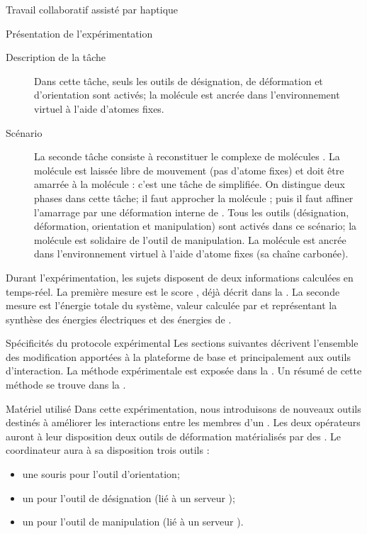 \documentclass[myfrancais,ngerman,english,french]{mythesis}
\begin{document}
\begin{mychapter}{Travail collaboratif assisté par haptique}
\begin{mysection}{Présentation de l'expérimentation}
\begin{mysubsection}{Description de la tâche}
\begin{description}
						Dans cette tâche, seuls les outils de désignation, de déformation et d'orientation sont activés; la molécule \myUbiquitin est ancrée dans l'environnement virtuel à l'aide d'atomes fixes.
					\item[Scénario~\myscenario{2}]
						La seconde tâche consiste à reconstituer le complexe de molécules \myNusENusG.
						La molécule \myNusG est laissée libre de mouvement (pas d'atome fixes) et doit être amarrée à la molécule \myNusE : c'est une tâche de  simplifiée.
						On distingue deux phases dans cette tâche; il faut approcher la molécule \myNusG; puis il faut affiner l'amarrage par une déformation interne de \myNusG.
						Tous les outils (désignation, déformation, orientation et manipulation) sont activés dans ce scénario; la molécule \myNusG est solidaire de l'outil de manipulation.
						La molécule \myNusE est ancrée dans l'environnement virtuel à l'aide d'atome fixes (sa chaîne carbonée).
				\end{description}

				Durant l'expérimentation, les sujets disposent de deux informations calculées en temps-réel.
				La première mesure est le score , déjà décrit dans la .
				La seconde mesure est l'énergie totale du système, valeur calculée par  et représentant la synthèse des énergies électriques et des énergies de .
			\end{mysubsection}
			\begin{mysubsection}{Spécificités du protocole expérimental}
				Les sections suivantes décrivent l'ensemble des modification apportées à la plateforme de base  et principalement aux outils d'interaction.
				La méthode expérimentale est exposée dans la .
				Un résumé de cette méthode se trouve dans la .
				\begin{mysubsubsection}{Matériel utilisé}
					Dans cette expérimentation, nous introduisons de nouveaux outils destinés à améliorer les interactions entre les membres d'un .
					Les deux opérateurs auront à leur disposition deux outils de déformation matérialisés par des \myOmni.
					Le coordinateur aura à sa disposition trois outils :
					\begin{itemize}
						\item une souris \myUSB pour l'outil d'orientation;
						\item un \myOmni pour l'outil de désignation (lié à un serveur );
						\item un \myDesktop pour l'outil de manipulation (lié à un serveur ).
					\end{itemize}


\end{mysubsubsection}
\end{mysubsection}
\end{mysection}
\end{mychapter}
\end{document}

